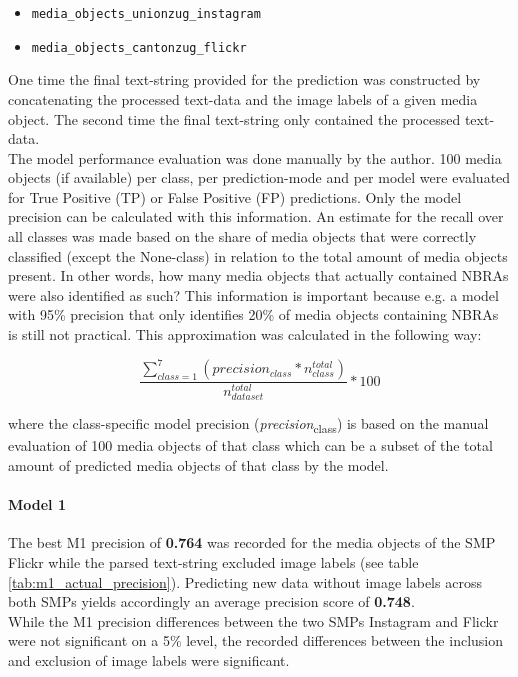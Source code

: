 \begin{itemize}
    \item \texttt{media\_objects\_unionzug\_instagram} \item \texttt{media\_objects\_cantonzug\_flickr}
\end{itemize}

One time the final text-string provided for the prediction was constructed by concatenating the processed text-data and the image labels of a given media object. The second time the final text-string only contained the processed text-data.\\

The model performance evaluation was done manually by the author. 100 media objects (if available) per class, per prediction-mode and per model were evaluated for True Positive (TP) or False Positive (FP) predictions. Only the model precision can be calculated with this information. An estimate for the recall over all classes was made based on the share of media objects that were correctly classified (except the None-class) in relation to the total amount of media objects present. In other words, how many media objects that actually contained NBRAs were also identified as such? This information is important because e.g. a model with 95\% precision that only identifies 20\% of media objects containing NBRAs is still not practical. This approximation was calculated in the following way:

\begin{equation}
\label{equation_share_TP}
\frac{\sum_{class=1}^{7}(precision_{class}  * n^{total}_{class})}{n^{total}_{dataset}} * 100
\end{equation}
   
where the class-specific model precision (\textit{precision}\textsubscript{class}) is based on the manual evaluation of 100 media objects of that class which can be a subset of the total amount of predicted media objects of that class by the model.

\paragraph*{Model 1}
The best M1 precision of \textbf{0.764} was recorded for the media objects of the SMP Flickr while the parsed text-string excluded image labels (see table \ref{tab:m1_actual_precision}). Predicting new data without image labels across both SMPs yields accordingly an average precision score of \textbf{0.748}.\\
While the M1 precision differences between the two SMPs Instagram and Flickr were not significant on a 5\% level, the recorded differences between the inclusion and exclusion of image labels were significant.

